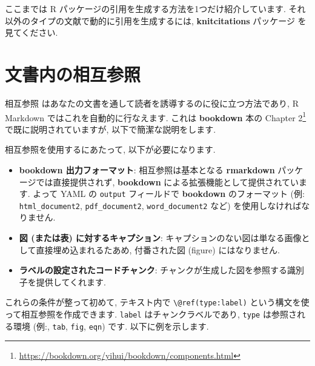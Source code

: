 \documentclass[
  11pt,
  lualatex,ja=standard,jafont=noto]{bxjsreport}
\renewcommand{\href}[2]{#2\footnote{\url{#1}}}
\begin{document}
ここまでは R パッケージの引用を生成する方法を1つだけ紹介しています. それ以外のタイプの文献で動的に引用を生成するには, \textbf{knitcitations} パッケージ \autocite{R-knitcitations} を見てください.

\hypertarget{cross-ref}{%
\section{文書内の相互参照}\label{cross-ref}}

相互参照 はあなたの文書を通して読者を誘導するのに役に立つ方法であり, R Markdown ではこれを自動的に行なえます. これは \textbf{bookdown} 本の \href{https://bookdown.org/yihui/bookdown/components.html}{Chapter 2} で既に説明されていますが, 以下で簡潔な説明をします.

相互参照を使用するにあたって, 以下が必要になります.

\begin{itemize}
\item
  \textbf{bookdown 出力フォーマット}: 相互参照は基本となる \textbf{rmarkdown} パッケージでは直接提供されず, \textbf{bookdown} \autocite{R-bookdown} による拡張機能として提供されています. よって YAML の \texttt{output} フィールドで \textbf{bookdown} のフォーマット (例: \texttt{html\_document2}, \texttt{pdf\_document2}, \texttt{word\_document2} など) を使用しなければなりません.
\item
  \textbf{図 (または表) に対するキャプション}: キャプションのない図は単なる画像として直接埋め込まれるたあめ, 付番された図 (figure) にはなりません.
\item
  \textbf{ラベルの設定されたコードチャンク}: チャンクが生成した図を参照する識別子を提供してくれます.
\end{itemize}

これらの条件が整って初めて, テキスト内で \texttt{\textbackslash{}@ref(type:label)} という構文を使って相互参照を作成できます. \texttt{label} はチャンクラベルであり, \texttt{type} は参照される環境 (例:, \texttt{tab}, \texttt{fig}, \texttt{eqn}) です. 以下に例を示します.
\end{document}

